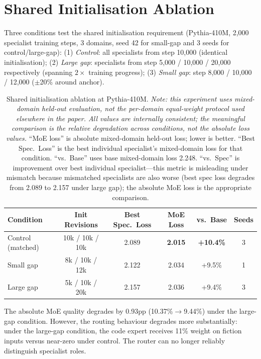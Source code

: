 \documentclass{article}
\begin{document}
\section{Shared Initialisation Ablation}
\label{app:sharedinit}

Three conditions test the shared initialisation requirement (Pythia-410M, 2,000 specialist training steps, 3 domains, seed 42 for small-gap and 3 seeds for control/large-gap): (1) \emph{Control}: all specialists from step 10,000 (identical initialisation); (2) \emph{Large gap}: specialists from step 5,000 / 10,000 / 20,000 respectively (spanning $2\times$ training progress); (3) \emph{Small gap}: step 8,000 / 10,000 / 12,000 ($\pm$20\% around anchor).

\begin{table}[h]
\centering
\caption{Shared initialisation ablation at Pythia-410M. \emph{Note: this experiment uses mixed-domain held-out evaluation, not the per-domain equal-weight protocol used elsewhere in the paper. All values are internally consistent; the meaningful comparison is the relative degradation across conditions, not the absolute loss values.} ``MoE loss'' is absolute mixed-domain held-out loss; lower is better. ``Best Spec.\ Loss'' is the best individual specialist's mixed-domain loss for that condition. ``vs.\ Base'' uses base mixed-domain loss 2.248. ``vs.\ Spec'' is improvement over best individual specialist---this metric is misleading under mismatch because mismatched specialists are also worse (best spec loss degrades from 2.089 to 2.157 under large gap); the absolute MoE loss is the appropriate comparison.}
\label{tab:sharedinit}
\begin{tabular}{lccccc}
\toprule
\textbf{Condition} & \textbf{Init Revisions} & \textbf{Best Spec.\ Loss} & \textbf{MoE Loss} & \textbf{vs.\ Base} & \textbf{Seeds} \\
\midrule
Control (matched)  & 10k / 10k / 10k         & 2.089          & \textbf{2.015} & \textbf{+10.4\%} & 3 \\
Small gap          & 8k / 10k / 12k          & 2.122          & 2.034          & +9.5\%           & 1 \\
Large gap          & 5k / 10k / 20k          & 2.157          & 2.036          & +9.4\%           & 3 \\
\bottomrule
\end{tabular}
\end{table}

The absolute MoE quality degrades by 0.93pp (10.37\%$\rightarrow$9.44\%) under the large-gap condition. However, the routing behaviour degrades more substantially: under the large-gap condition, the code expert receives 11\% weight on fiction inputs versus near-zero under control. The router can no longer reliably distinguish specialist roles.
\end{document}

